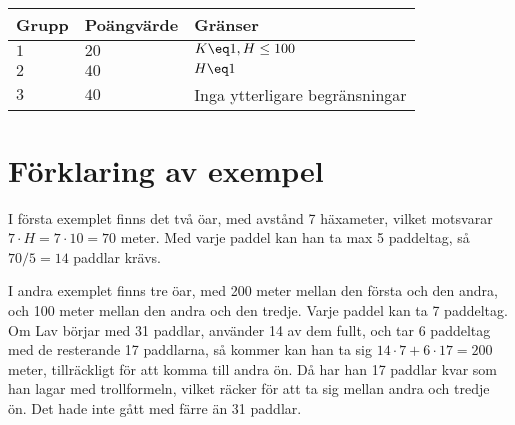 \noindent
\begin{tabular}{| l | l | l |}
  \hline
  Grupp & Poängvärde & Gränser \\ \hline
  $1$    & $20$        &  $ K \eq 1, H \leq 100 $ \\ \hline 
  $2$    & $40$        &  $ H \eq 1 $ \\ \hline
  $3$    & $40$        &  Inga ytterligare begränsningar \\ \hline
\end{tabular}

\section*{Förklaring av exempel}

I första exemplet finns det två öar, med avstånd 7 häxameter, vilket motsvarar $7\cdot H = 7\cdot 10=70$ meter. Med varje paddel kan han ta max 5 paddeltag, så $70/5 = 14$ paddlar krävs.

I andra exemplet finns tre öar, med 200 meter mellan den första och den andra, och 100 meter mellan den andra och den tredje. Varje paddel kan ta 7 paddeltag. Om Lav börjar med 31 paddlar, använder 14 av dem fullt, och tar 6 paddeltag med de resterande 17 paddlarna, så kommer kan han ta sig $14\cdot 7+6\cdot 17=200$ meter, tillräckligt för att komma till andra ön. Då har han 17 paddlar kvar som han lagar med trollformeln, vilket räcker för att ta sig mellan andra och tredje ön. Det hade inte gått med färre än 31 paddlar.
